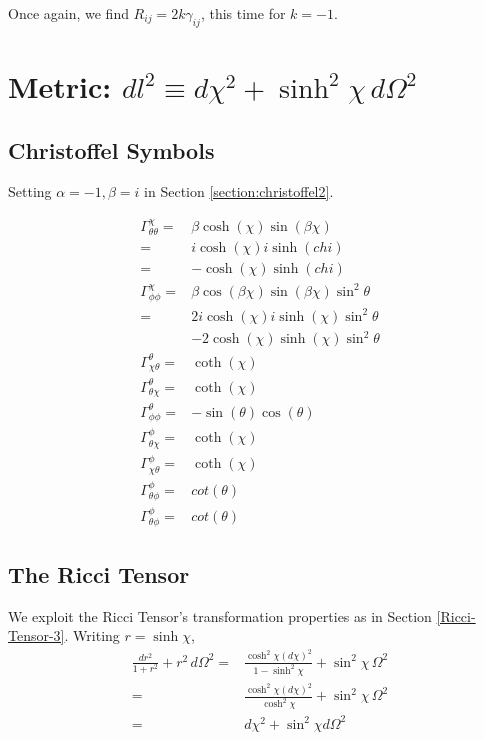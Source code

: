\documentclass[]{article}
\begin{document}
Once again, we find $R_{ij}=2 k \gamma_{ij}$, this time for $k=-1$.

\section{Metric: $dl^2\equiv d\chi^2+\sinh^2 \chi\,d\Omega^2$} \label{section:metric4}

\subsection{Christoffel Symbols}

Setting $\alpha=-1,\beta=i$ in Section \ref{section:christoffel2}.

\begin{align*}
\Gamma^{\chi}_{\theta\theta}=&\beta \cosh{(\chi)}\sin{(\beta\chi)}\\
=&i \cosh{(\chi)}i \sinh{(chi)}\\
=&- \cosh{(\chi)} \sinh{(chi)}\\
\Gamma^{\chi}_{\phi\phi}=&\beta \cos{(\beta\chi)}\sin{(\beta\chi)}\sin^2 \theta\\
=&2i \cosh{(\chi)} i \sinh{(\chi)}\sin^2 \theta\\
&-2 \cosh{(\chi)}  \sinh{(\chi)}\sin^2 \theta\\
\Gamma^{\theta}_{\chi\theta}=&\coth{(\chi)}\\
\Gamma^{\theta}_{\theta\chi}=&\coth{(\chi)}\\
\Gamma^{\theta}_{\phi\phi}=&-\sin{(\theta)}\cos{(\theta)}\\
\Gamma^{\phi}_{\theta\chi}=&\coth{(\chi)}\\
\Gamma^{\phi}_{\chi\theta}=&\coth{(\chi)}\\
\Gamma^{\phi}_{\theta\phi}=&cot{(\theta)}\\
\Gamma^{\phi}_{\theta\phi}=&cot{(\theta)}
\end{align*}

\subsection{The Ricci Tensor}

We exploit the Ricci Tensor's transformation properties as in Section \ref{Ricci-Tensor-3}. Writing $r=\sinh \chi$,
\begin{align*}
\frac{dr^2}{1+r^2}+r^2\,d\Omega^2=&\frac{\cosh^2 \chi (d \chi)^2}{1-\sinh^2 \chi}+\sin^2 \chi\,\Omega^2\\
=&\frac{\cosh^2 \chi (d \chi)^2}{\cosh^2 \chi}+\sin^2 \chi\,\Omega^2\\
=&d\chi^2 + \sin^2 \chi d\Omega^2
\end{align*}
\end{document}
